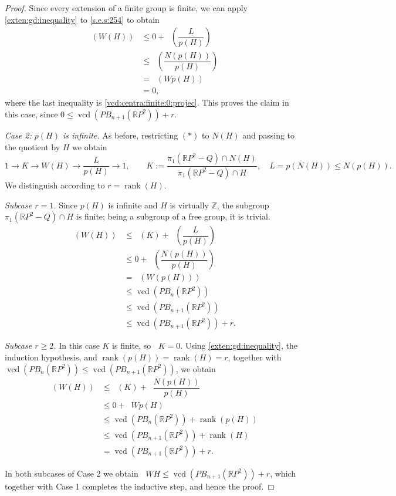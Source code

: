 \documentclass[a4paper,12pt,leqno]{amsart}
\theoremstyle{definition}
\newcommand{\calF}{{\mathcal F}}
\DeclareMathOperator{\vcd}{vcd}
\DeclareMathOperator{\gdfin}{gd_{\calF_0}}
\DeclareMathOperator{\rank}{rank}
\begin{document}
\begin{proof}
Since every extension of a finite group is finite, we can apply \cref{exten:gd:inequality} to \cref{s.e.s:254} to obtain
\[
\begin{split}
\gdfin(W(H)) 
&\le 0 + \gdfin(\dfrac{L}{p(H)}) \\
&\le \gdfin(\dfrac{N(p(H))}{p(H)}) \\
&= \gdfin(Wp(H)) \\
&= 0,
\end{split}
\]
where the last inequality is \cref{vcd:centra:finite:0:projec}. This proves the claim in this case, since $0\le \vcd(PB_{n+1}(\mathbb{R}P^2))+r$.

\medskip
\noindent\emph{Case 2: $p(H)$ is infinite.}
As before, restricting $(*)$ to $N(H)$ and passing to the quotient by $H$ we obtain
\[
1\to K \to W(H) \to \dfrac{L}{p(H)} \to 1, \qquad
K:=\dfrac{\pi_1(\mathbb{R}P^2-Q)\cap N(H)}{\pi_1(\mathbb{R}P^2-Q)\cap H}, \quad L=p(N(H))\le N(p(H)).
\]
We distinguish according to $r=\rank(H)$.

\smallskip
\noindent\textit{Subcase $r=1$.}
Since $p(H)$ is infinite and $H$ is virtually $\mathbb{Z}$, the subgroup $\pi_1(\mathbb{R}P^2-Q)\cap H$ is finite; being a subgroup of a free group, it is trivial. 
\[
\begin{split}
\gdfin(W(H))
&\le \gdfin(K)+\gdfin(\dfrac{L}{p(H)}) \\
&\le 0+ \gdfin(\dfrac{N(p(H))}{p(H)}) \\
&= \gdfin(W(p(H))) \\
&\le \vcd(PB_n(\mathbb{R}P^2)) \\
&\leq\vcd(PB_{n+1}(\mathbb{R}P^2)) \\
&\leq \vcd(PB_{n+1}(\mathbb{R}P^2))+r.
\end{split}
\]

\smallskip
\noindent\textit{Subcase $r\ge 2$.}
In this case $K$ is finite, so  $\gdfin{K}=0$. Using \cref{exten:gd:inequality}, the induction hypothesis, and $\rank(p(H))=\rank(H)=r$, together with $\vcd(PB_n(\mathbb{R}P^2))\le\vcd(PB_{n+1}(\mathbb{R}P^2))$, we obtain
\[
\begin{split}
\gdfin(W(H))
&\le \gdfin(K)+\gdfin{\dfrac{N(p(H))}{p(H)}} \\
&\le 0+\gdfin{W{p(H)}} \\
&\le \vcd(PB_n(\mathbb{R}P^2))+\rank(p(H)) \\
&\le \vcd(PB_{n+1}(\mathbb{R}P^2))+\rank(H) \\
&= \vcd(PB_{n+1}(\mathbb{R}P^2))+r.
\end{split}
\]

In both subcases of Case 2 we obtain $\gdfin{W{H}}\le \vcd(PB_{n+1}(\mathbb{R}P^2))+r$, which together with Case 1 completes the inductive step, and hence the proof.
\end{proof}
\end{document}
